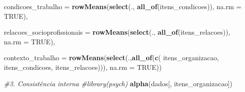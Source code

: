 \documentclass[
]{article}
\newenvironment{Shaded}{\begin{snugshade}}{\end{snugshade}}
\newcommand{\AttributeTok}[1]{\textcolor[rgb]{0.13,0.29,0.53}{#1}}
\newcommand{\CommentTok}[1]{\textcolor[rgb]{0.56,0.35,0.01}{\textit{#1}}}
\newcommand{\ConstantTok}[1]{\textcolor[rgb]{0.56,0.35,0.01}{#1}}
\newcommand{\FunctionTok}[1]{\textcolor[rgb]{0.13,0.29,0.53}{\textbf{#1}}}
\newcommand{\NormalTok}[1]{#1}
\begin{document}
\begin{Shaded}
\begin{Highlighting}[]
    \AttributeTok{condicoes\_trabalho =}
      \FunctionTok{rowMeans}\NormalTok{(}\FunctionTok{select}\NormalTok{(., }\FunctionTok{all\_of}\NormalTok{(itens\_condicoes)),}
               \AttributeTok{na.rm =} \ConstantTok{TRUE}\NormalTok{),}
    
    \AttributeTok{relacoes\_socioprofissionais =}
      \FunctionTok{rowMeans}\NormalTok{(}\FunctionTok{select}\NormalTok{(., }\FunctionTok{all\_of}\NormalTok{(itens\_relacoes)),}
               \AttributeTok{na.rm =} \ConstantTok{TRUE}\NormalTok{),}
    
    \AttributeTok{contexto\_trabalho =}
      \FunctionTok{rowMeans}\NormalTok{(}\FunctionTok{select}\NormalTok{(.,}\FunctionTok{all\_of}\NormalTok{(}\FunctionTok{c}\NormalTok{(}
\NormalTok{                        itens\_organizacao,}
\NormalTok{                        itens\_condicoes,}
\NormalTok{                        itens\_relacoes))), }
               \AttributeTok{na.rm =} \ConstantTok{TRUE}\NormalTok{))}

\CommentTok{\#3. Consistência interna}
\CommentTok{\#library(psych)}
\FunctionTok{alpha}\NormalTok{(dados[, itens\_organizacao])}
\end{Highlighting}
\end{Shaded}
\end{document}
